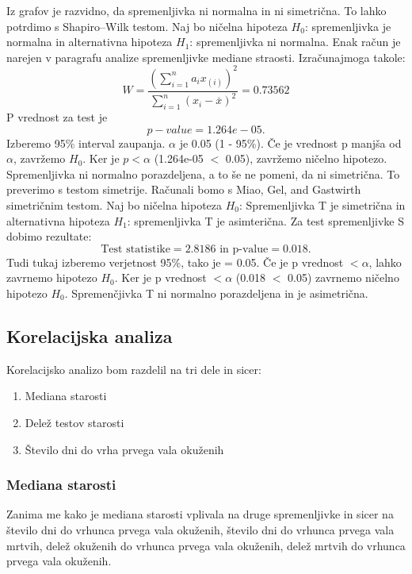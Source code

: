 \documentclass[a4paper,11pt]{article}
\begin{document}
Iz grafov je razvidno, da spremenljivka ni normalna in ni simetrična. To lahko potrdimo s Shapiro–Wilk testom. Naj bo ničelna hipoteza \(H_0\): spremenljivka je normalna in alternativna hipoteza \(H_1\): spremenljivka ni normalna. Enak račun je narejen v paragrafu analize spremenljivke mediane straosti. Izračunajmoga takole:
\[W = \frac{(\sum_{i = 1}^{n}a_i x_{(i)})^2}{\sum_{i = 1}^{n}(x_i - \overset{\_}{x})^2} = 0.73562\]
 P vrednost za test je 
\[ p-value = 1.264e-05. \]
Izberemo 95\% interval zaupanja. \(\alpha\) je 0.05 (1 - 95\%). Če je vrednost p manjša od \(\alpha\), zavržemo \(H_0\). Ker je \(p < \alpha\) (1.264e-05 \(<\) 0.05), zavržemo ničelno hipotezo. Spremenljivka ni normalno porazdeljena, a to še ne pomeni, da ni simetrična. To preverimo s testom simetrije. Računali bomo s Miao, Gel, and Gastwirth simetričnim testom. Naj bo ničelna hipoteza \(H_0\): Spremenljivka T je simetrična in alternativna hipoteza \(H_1\): spremenljivka T je asimterična. Za test spremenljivke S dobimo rezultate:
\[\text{Test statistike} = 2.8186 \text{ in p-value} =  0.018.\]
Tudi tukaj izberemo verjetnost 95\%, tako je \alpha = 0.05. Če je p vrednost \(< \alpha\), lahko zavrnemo hipotezo \(H_0\). Ker je p vrednost \(< \alpha\) (0.018 \(<\) 0.05) zavrnemo ničelno hipotezo \(H_0\). Spremenčjivka T ni normalno porazdeljena in je asimetrična.

\subsection{Korelacijska analiza}
Korelacijsko analizo bom razdelil na tri dele in sicer:
\begin{enumerate}
\item{Mediana starosti}
\item{Delež testov starosti}
\item{Število dni do vrha prvega vala okuženih}
\end{enumerate}

\subsubsection{Mediana starosti}
Zanima me kako je mediana starosti vplivala na druge spremenljivke in sicer na število dni do vrhunca prvega vala okuženih, število dni do vrhunca prvega vala mrtvih, delež okuženih do vrhunca prvega vala okuženih, delež mrtvih do vrhunca prvega vala okuženih.
\end{document}
